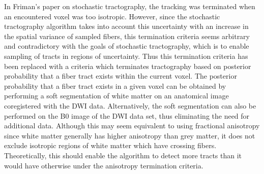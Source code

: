 In Friman's paper on stochastic tractography, the tracking was terminated when an encountered voxel was too isotropic.  However, since the stochastic tractography algorithm takes into account this uncertainty with an increase in the spatial variance of sampled fibers, this termination criteria seems arbitrary and contradictory with the goals of stochastic tractography, which is to enable sampling of tracts in regions of uncertainty.  Thus this termination criteria has been replaced with a criteria which terminates tractography based on posterior probability that a fiber tract exists within the current voxel.  The posterior probability that a fiber tract exists in a given voxel can be obtained by performing a soft segmentation of white matter on an anatomical image coregistered with the DWI data.  Alternatively, the soft segmentation can also be performed on the B0 image of the DWI data set, thus eliminating the need for additional data.  Although this may seem equivalent to using fractional anisotropy since white matter generally has higher anisotropy than grey matter, it does not exclude isotropic regions of white matter which have crossing fibers.  Theoretically, this should enable the algorithm to detect more tracts than it would have otherwise under the anisotropy termination criteria.





